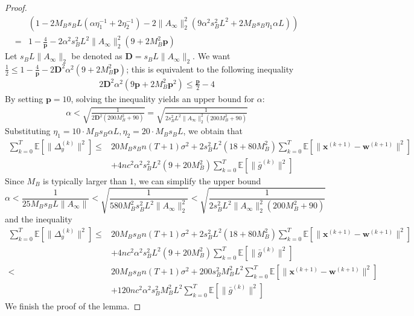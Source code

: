 \documentclass{article}
\newcommand{\vw}{{\mathbf{w}}}
\newcommand{\vx}{{\mathbf{x}}}
\newcommand{\EE}[1]{\mathbb{E}\left[#1\right]}
\newcommand{\norm}[1]{\| #1 \|}
\begin{document}
\begin{proof}
\begin{align*}
  &\left(1-2M_Bs_BL(\alpha\eta_1^{-1}+2\eta_2^{-1})-2\norm{A_{\infty}}_2^2(9\alpha^2s_B^2L^2+2M_Bs_B\eta_1\alpha L) \right)\\ 
  =&1- \frac{4}{\mathbf{p}}-2\alpha^2s_B^2L^2\norm{A_{\infty}}_2^2(9+2M_B^2 \mathbf{p})
\end{align*}
Let $s_BL\norm{A_{\infty}}_2$ be denoted as $\mathbf{D}=s_BL\norm{A_{\infty}}_2$. We want $\frac{1}{2}\leq 1- \frac{4}{\mathbf{p}}-2\mathbf{D}^2\alpha^2(9+2M_B^2 \mathbf{p})$; this is equivalent to the following inequality 
\begin{align*}
  2\mathbf{D}^2\alpha^2(9\mathbf{p}+2M_B^2\mathbf{p}^2)\leq \frac{\mathbf{p}}{2}-4
\end{align*}
By setting $\mathbf{p}=10$, solving the inequality yields an upper bound for $\alpha$:
\begin{align*}
  \alpha < \sqrt{\frac{1}{2\mathbf{D}^2(200M_B^2+90)}} =  \sqrt{\frac{1}{2s_B^2L^2\norm{A_{\infty}}_2^2(200M_B^2+90)}}
\end{align*}
Substituting $\eta_1=10\cdot M_Bs_B\alpha L,\eta_2=20\cdot M_Bs_BL$, we obtain that
\begin{align*}
    \sum_{k=0}^T \EE{\norm{\Delta_y^{(k)}}^2}
  \leq& 20M_Bs_Bn (T+1)\sigma^2+2s_B^2L^2(18+80M_B^2)\sum_{k=0}^T\EE{\norm{\vx^{(k+1)}-\vw^{(k+1)}}^2}\\&+4nc^2\alpha^2s_B^2L^2(9+20M_B^2) \sum_{k=0}^T \EE{\norm{\bar{g}^{(k)}}^2}
\end{align*}
Since $M_B$ is typically larger than $1$, we can simplify the upper bound 
$$\alpha< \frac{1}{25M_Bs_BL\norm{A_{\infty}}}<\sqrt{\frac{1}{580M_B^2s_B^2L^2\norm{A_{\infty}}_2^2}}< \sqrt{\frac{1}{2s_B^2L^2\norm{A_{\infty}}_2^2(200M_B^2+90)}}$$
and the inequality
\begin{align*}
    \sum_{k=0}^T \EE{\norm{\Delta_y^{(k)}}^2}
  \leq& 20M_Bs_Bn (T+1)\sigma^2+2s_B^2L^2(18+80M_B^2)\sum_{k=0}^T\EE{\norm{\vx^{(k+1)}-\vw^{(k+1)}}^2}\\&+4nc^2\alpha^2s_B^2L^2(9+20M_B^2) \sum_{k=0}^T \EE{\norm{\bar{g}^{(k)}}^2}\\
  <&20M_Bs_Bn (T+1)\sigma^2+200s_B^2M_B^2L^2\sum_{k=0}^T\EE{\norm{\vx^{(k+1)}-\vw^{(k+1)}}^2}\\&+120nc^2\alpha^2s_B^2M_B^2L^2 \sum_{k=0}^T \EE{\norm{\bar{g}^{(k)}}^2}
\end{align*}
We finish the proof of the lemma.
\end{proof}
\end{document}
